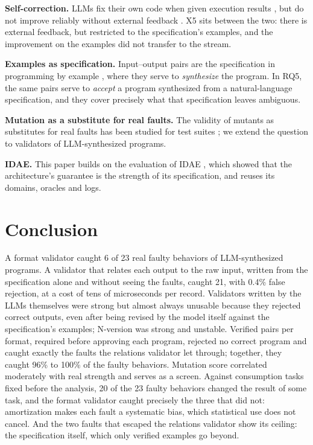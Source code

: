 \documentclass[sigconf,nonacm]{acmart}
\begin{document}
\textbf{Self-correction.} LLMs fix their own code when given execution results \cite{chen2024selfdebug}, but do not improve reliably without external feedback \cite{huang2024cannot}. X5 sits between the two: there is external feedback, but restricted to the specification's examples, and the improvement on the examples did not transfer to the stream.

\textbf{Examples as specification.} Input--output pairs are the specification in programming by example \cite{gulwani2011flashfill}, where they serve to \textit{synthesize} the program. In RQ5, the same pairs serve to \textit{accept} a program synthesized from a natural-language specification, and they cover precisely what that specification leaves ambiguous.

\textbf{Mutation as a substitute for real faults.} The validity of mutants as substitutes for real faults has been studied for test suites \cite{just2014mutants,jia2011mutation}; we extend the question to validators of LLM-synthesized programs.

\textbf{IDAE.} This paper builds on the evaluation of IDAE \cite{batista2026idae}, which showed that the architecture's guarantee is the strength of its specification, and reuses its domains, oracles and logs.

\section{Conclusion}

A format validator caught 6 of 23 real faulty behaviors of LLM-synthesized programs. A validator that relates each output to the raw input, written from the specification alone and without seeing the faults, caught 21, with 0.4\% false rejection, at a cost of tens of microseconds per record. Validators written by the LLMs themselves were strong but almost always unusable because they rejected correct outputs, even after being revised by the model itself against the specification's examples; N-version was strong and unstable. Verified pairs per format, required before approving each program, rejected no correct program and caught exactly the faults the relations validator let through; together, they caught 96\% to 100\% of the faulty behaviors. Mutation score correlated moderately with real strength and serves as a screen. Against consumption tasks fixed before the analysis, 20 of the 23 faulty behaviors changed the result of some task, and the format validator caught precisely the three that did not: amortization makes each fault a systematic bias, which statistical use does not cancel. And the two faults that escaped the relations validator show its ceiling: the specification itself, which only verified examples go beyond.
\end{document}
